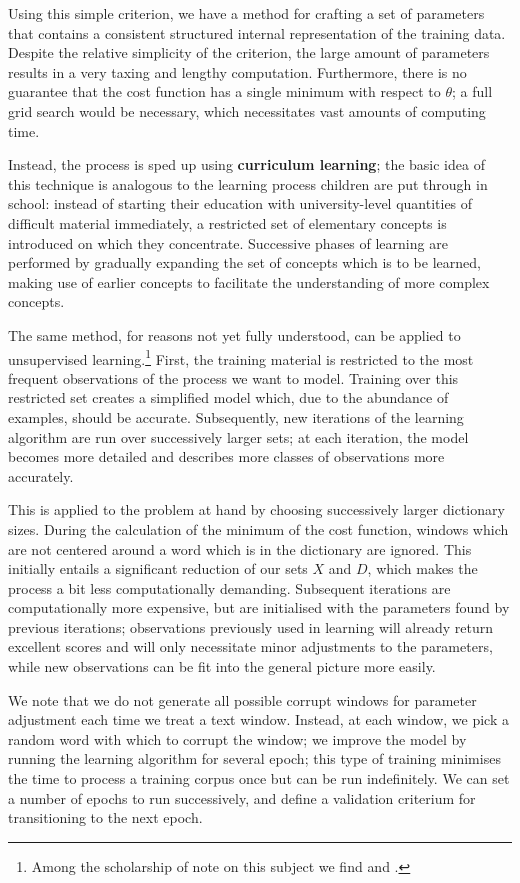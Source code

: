 Using this simple criterion, we have a method for crafting a set of
parameters that contains a consistent structured internal
representation of the training data. Despite the relative simplicity
of the criterion, the large amount of parameters results in a very
taxing and lengthy computation. Furthermore, there is no guarantee
that the cost function has a single minimum with respect to $\theta$;
a full grid search would be necessary, which necessitates vast amounts
of computing time.

Instead, the process is sped up using \textbf{curriculum learning};
the basic idea of this technique is analogous to the learning process
children are put through in school: instead of starting their
education with university-level quantities of difficult material
immediately, a restricted set of elementary concepts is introduced on
which they concentrate. Successive phases of learning are performed by
gradually expanding the set of concepts which is to be learned, making
use of earlier concepts to facilitate the understanding of more
complex concepts.

The same method, for reasons not yet fully understood, can be applied
to unsupervised learning.\footnote{Among the scholarship of note on
  this subject we find \citet{bengio2009curriculum} and
  \citet{erhan2010}.} First, the training material is restricted to the
most frequent observations of the process we want to model. Training
over this restricted set creates a simplified model which, due to the
abundance of examples, should be accurate. Subsequently, new
iterations of the learning algorithm are run over successively larger
sets; at each iteration, the model becomes more detailed and describes
more classes of observations more accurately.

This is applied to the problem at hand by choosing
successively larger dictionary sizes. During the calculation of the
minimum of the cost function, windows which are not centered around a
word which is in the dictionary are ignored. This initially entails a
significant reduction of our sets $X$ and $D$, which makes the process
a bit less computationally demanding. Subsequent iterations are
computationally more expensive, but are initialised with the
parameters found by previous iterations; observations previously used
in learning will already return excellent scores and will only
necessitate minor adjustments to the parameters, while new
observations can be fit into the general picture more easily.

We note that we do not generate all possible corrupt windows for
parameter adjustment each time we treat a text window. Instead, at
each window, we pick a random word with which to corrupt the window;
we improve the model by running the learning algorithm for several
epoch; this type of training minimises the time to process a training
corpus once but can be run indefinitely. We can set a number of epochs
to run successively, and define a validation criterium for
transitioning to the next epoch.

